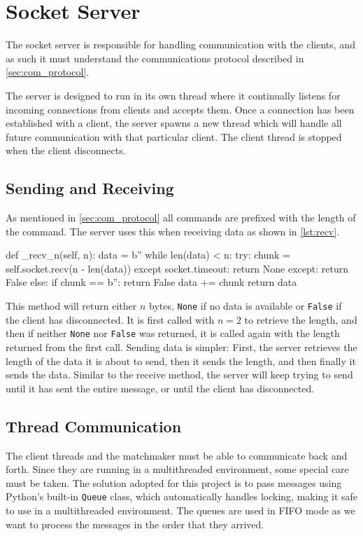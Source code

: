 \section{Socket Server}
The socket server is responsible for handling communication with the clients, and as such it must understand the communications protocol described in \autoref{sec:com_protocol}.

The server is designed to run in its own thread where it continually listens for incoming connections from clients and accepts them.
Once a connection has been established with a client, the server spawns a new thread which will handle all future communication with that particular client.
The client thread is stopped when the client disconnects.

\subsection{Sending and Receiving}
As mentioned in \autoref{sec:com_protocol} all commands are prefixed with the length of the command.
The server uses this when receiving data as shown in \autoref{lst:recv}.

\begin{code}[language={Python}, caption={Method for Receiving $n$ Bytes}, label={lst:recv}]
def _recv_n(self, n):
	data = b''
	while len(data) < n:
		try:
			chunk = self.socket.recv(n - len(data))
		except socket.timeout:
			return None
		except:
			return False
		else:
			if chunk == b'':
				return False
			data += chunk
	return data
\end{code}

This method will return either $n$ bytes, \texttt{None} if no data is available or \texttt{False} if the client has disconnected.
It is first called with $n=2$ to retrieve the length, and then if neither \texttt{None} nor \texttt{False} was returned, it is called again with the length returned from the first call.
Sending data is simpler: First, the server retrieves the length of the data it is about to send, then it sends the length, and then finally it sends the data.
Similar to the receive method, the server will keep trying to send until it has sent the entire message, or until the client has disconnected.

\subsection{Thread Communication}
The client threads and the matchmaker must be able to communicate back and forth.
Since they are running in a multithreaded environment, some special care must be taken.
The solution adopted for this project is to pass messages using Python's built-in \texttt{Queue} class, which automatically handles locking, making it safe to use in a multithreaded environment.
The queues are used in FIFO mode as we want to process the messages in the order that they arrived.

